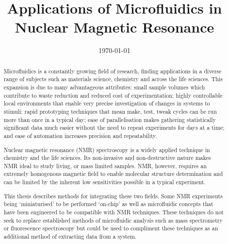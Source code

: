 \documentclass{ecsthesis}      %
\begin{document}
\frontmatter
\title      {Applications of Microfluidics in Nuclear Magnetic Resonance}
\addresses  {\groupname\\\deptname\\\univname}
\date       {\today}
\subject    {}
\keywords   {}
\maketitle
\begin{abstract}
  Microfluidics is a constantly growing field of research, finding applications in a diverse range of subjects
  such as materials science, chemistry and across the life sciences. This expansion is due to many advantageous attributes:
  small sample volumes which contribute to waste reduction and reduced cost of
  experimentation; highly controllable local environments that enable very precise investigation of changes in
  systems to stimuli; rapid prototyping techniques that mean make, test, tweak cycles can be run more than once
  in a typical day; ease of parallelisation makes gathering statistically significant data much easier without
  the need to repeat experiments for days at a time; and ease of automation increases precision and repeatability.

  Nuclear magnetic resonance (NMR) spectroscopy is a widely applied technique in chemistry and the life sciences.
  Its non-invasive and non-destructive nature makes NMR ideal to study living, or mass limited samples. NMR, however,
  requires an extremely homogenous magnetic field to enable molecular structure determination and can be limited
  by the inherent low sensitivities possible in a typical experiment.

  This thesis describes methods for integrating these two fields. Some NMR experiments being ‘miniaturised’ to
  be performed ‘on-chip’ as well as microfluidic concepts that have been engineered to be compatible with NMR
  techniques. These techniques do not seek to replace established methods of microfluidic analysis such as mass
  spectrometry or fluorescence spectroscopy but could be used to compliment these techniques as an additional
  method of extracting data from a system.

\end{abstract}
\tableofcontents
\end{document}
